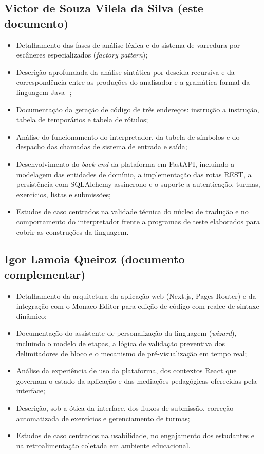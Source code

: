 \subsection{Victor de Souza Vilela da Silva (este documento)}

\begin{itemize}
    \item Detalhamento das fases de análise léxica e do sistema de varredura por escâneres especializados (\textit{factory pattern});
    \item Descrição aprofundada da análise sintática por descida recursiva e da correspondência entre as produções do analisador e a gramática formal da linguagem Java-{}-;
    \item Documentação da geração de código de três endereços: instrução a instrução, tabela de temporários e tabela de rótulos;
    \item Análise do funcionamento do interpretador, da tabela de símbolos e do despacho das chamadas de sistema de entrada e saída;
    \item Desenvolvimento do \textit{back-end} da plataforma em FastAPI, incluindo a modelagem das entidades de domínio, a implementação das rotas REST, a persistência com SQLAlchemy assíncrono e o suporte a autenticação, turmas, exercícios, listas e submissões;
    \item Estudos de caso centrados na validade técnica do núcleo de tradução e no comportamento do interpretador frente a programas de teste elaborados para cobrir as construções da linguagem.
\end{itemize}

\subsection{Igor Lamoia Queiroz (documento complementar)}

\begin{itemize}
    \item Detalhamento da arquitetura da aplicação web (Next.js, Pages Router) e da integração com o Monaco Editor para edição de código com realce de sintaxe dinâmico;
    \item Documentação do assistente de personalização da linguagem (\textit{wizard}), incluindo o modelo de etapas, a lógica de validação preventiva dos delimitadores de bloco e o mecanismo de pré-visualização em tempo real;
    \item Análise da experiência de uso da plataforma, dos contextos React que governam o estado da aplicação e das mediações pedagógicas oferecidas pela interface;
    \item Descrição, sob a ótica da interface, dos fluxos de submissão, correção automatizada de exercícios e gerenciamento de turmas;
    \item Estudos de caso centrados na usabilidade, no engajamento dos estudantes e na retroalimentação coletada em ambiente educacional.
\end{itemize}
